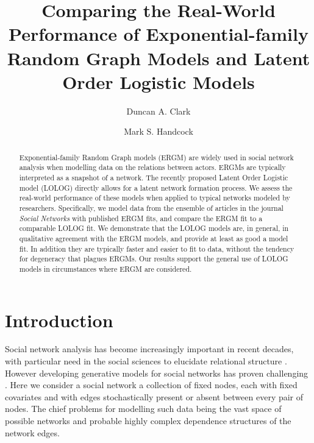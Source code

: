 \documentclass[
]{statsoc}
\title[ERGM and LOLOG Real-World Performance]{Comparing the Real-World Performance of Exponential-family Random Graph Models and Latent Order Logistic Models}
\author[Duncan A. Clark]{Duncan A. Clark}
\author[Mark S. Handcock]{Mark S. Handcock}
\author{}
\date{\vspace{-2.5em}}
\begin{document}
\newcommand{\R}{\mathbb{R}}
\newcommand{\N}{\mathbb{N}}
\newcommand{\E}{\mathbb{E}}
\newcommand{\V}{\mathbb{V}}
\newcommand{\bfR}{\mathbf{R}}
\newcommand{\bfX}{\mathbf{X}}
\newcommand{\bfW}{\mathbf{W}}
\newcommand{\bfD}{\mathbf{D}}
\newcommand{\INT}{\int_{-\infty}^{+\infty}}
\newcommand{\p}{\partial}
\newcommand{\ra}{\Rightarrow}
\newcommand{\dH}{d\mathscr{H}}
\newcommand{\ch}{\text{cosh}}
\newcommand{\sh}{\text{sinh}}
\newcommand{\ex}{\mathbb{E}\left[X\right]}
\newcommand{\ey}{\mathbb{E}\left[Y\right]}
\newcommand{\logit}{{\rm logit}}
\newcommand{\MOM}{{\rm MOM}}

\setcounter{secnumdepth}{4}

\begin{abstract}
Exponential-family Random Graph models (ERGM) are widely used in social network analysis when modelling data on the relations between actors. ERGMs are typically interpreted as a snapshot of a network. The recently proposed Latent Order Logistic model (LOLOG) directly allows for a latent network formation process. We assess the real-world performance of these models when applied to typical networks modeled by researchers. Specifically, 
we model data from the ensemble of articles in the journal \textit{Social Networks} with published ERGM fits, and compare the ERGM fit to a comparable LOLOG fit. We demonstrate that the LOLOG models are, in general, in qualitative agreement with the ERGM models, and provide at least as good a model fit. In addition they are typically faster and easier to fit to data, without the tendency for degeneracy that plagues ERGMs.
Our results support the general use of LOLOG models in circumstances where ERGM are considered.
\end{abstract}

\section{Introduction}

Social network analysis has become increasingly important in recent
decades, with particular need in the social sciences to elucidate
relational structure \citep{Goldenberg2010}. However developing
generative models for social networks has proven challenging
\citep{chatterjee2013}. Here we consider a social network a collection
of fixed nodes, each with fixed covariates and with edges stochastically
present or absent between every pair of nodes. The chief problems for
modelling such data being the vast space of possible networks and
probable highly complex dependence structures of the network edges.
\end{document}
